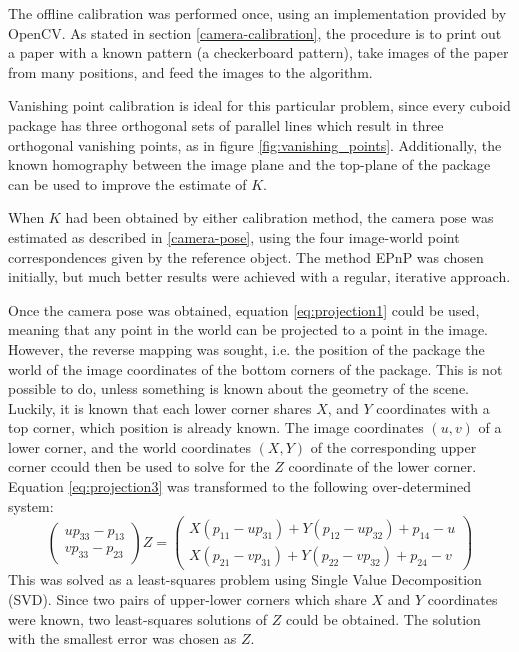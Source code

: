 The offline calibration was performed once, using an implementation provided by OpenCV.
As stated in section \ref{camera-calibration}, the procedure is to print out a paper with a known pattern (a checkerboard pattern), take images of the paper from many positions, and feed the images to the algorithm.

Vanishing point calibration is ideal for this particular problem, since every cuboid package has three orthogonal sets of parallel lines which result in three orthogonal vanishing points, as in figure \ref{fig:vanishing_points}.
Additionally, the known homography between the image plane and the top-plane of the package can be used to improve the estimate of $K$.

When $K$ had been obtained by either calibration method, the camera pose was estimated as described in \ref{camera-pose}, using the four image-world point correspondences given by the reference object.
The method EPnP was chosen initially, but much better results were achieved with a regular, iterative approach.

Once the camera pose was obtained, equation \ref{eq:projection1} could be used, meaning that any point in the world can be projected to a point in the image.
However, the reverse mapping was sought, i.e. the position of the package the world of the image coordinates of the bottom corners of the package.
This is not possible to do, unless something is known about the geometry of the scene.
Luckily, it is known that each lower corner shares $X$, and $Y$ coordinates with a top corner, which position is already known.
The image coordinates $(u,v)$ of a lower corner, and the world coordinates $(X,Y)$ of the corresponding upper corner ccould then be used to solve for the $Z$ coordinate of the lower corner. 
Equation \ref{eq:projection3} was transformed to the following over-determined system:
\begin{equation} \label{eq:constrained-projection}
\begin{pmatrix} up_{33}-p_{13} \\ vp_{33}-p_{23} \end{pmatrix} Z = 
\begin{pmatrix}
X(p_{11}-up_{31}) + Y(p_{12}-up_{32})+p_{14}-u \\
X(p_{21}-vp_{31}) + Y(p_{22}-vp_{32})+p_{24}-v
\end{pmatrix}
\end{equation}
This was solved as a least-squares problem using Single Value Decomposition (SVD).
Since two pairs of upper-lower corners which share $X$ and $Y$ coordinates were known, two least-squares solutions of $Z$ could be obtained.
The solution with the smallest error was chosen as $Z$.

